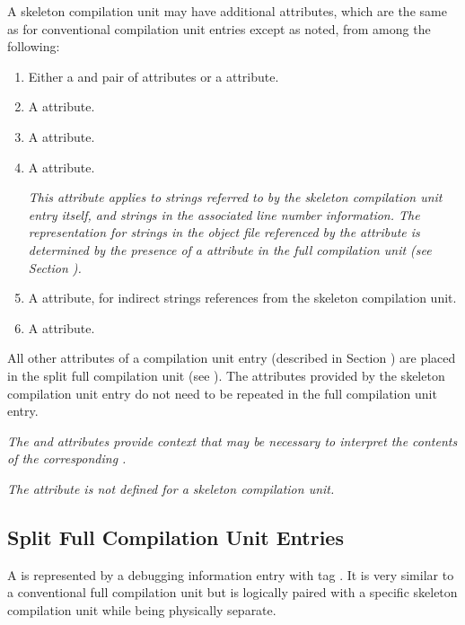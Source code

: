 A skeleton compilation unit may have additional attributes, 
which are the same as for conventional compilation unit entries 
except as noted, from among the following:
\begin{enumerate}[1. ]
\addtocounter{enumi}{1}
\item Either a \DWATlowpc{} and \DWAThighpc{} pair of attributes
or a \DWATranges{} attribute.
\item A \DWATstmtlist{} attribute.
\item A \DWATcompdir{} attribute.

\item A \DWATuseUTFeight{} attribute.

\textit{This attribute applies to strings referred to by the skeleton
compilation unit entry itself, and strings in the associated line
number information.
The representation for strings in the object file referenced 
by the \DWATdwoname{} attribute is determined by the presence 
of a \DWATuseUTFeight{} attribute in the full compilation unit 
(see Section ).}

\item A \DWATstroffsetsbase{} attribute, for indirect strings references 
from the skeleton compilation unit.
\item A \DWATaddrbase{} attribute.

\end{enumerate}

All other attributes of a compilation unit entry (described
in Section )
are placed in the split full compilation unit
(see ).
The attributes provided by the skeleton compilation
unit entry do not need to be repeated in the full compilation
unit entry.

\textit{The \DWATaddrbase{} 
and \DWATstroffsetsbase{} attributes provide context that may be 
necessary to interpret the contents
of the corresponding \splitDWARFobjectfile.}

\textit{The \DWATbasetypes{} attribute is not defined for a
skeleton compilation unit.}


\subsection{Split Full Compilation Unit Entries}
\label{chap:splitfullcompilationunitentries}
A  is represented by a 
debugging information entry with tag \DWTAGcompileunit.
It is very similar to a conventional full compilation unit but
is logically paired with a specific skeleton compilation unit while
being physically separate.

